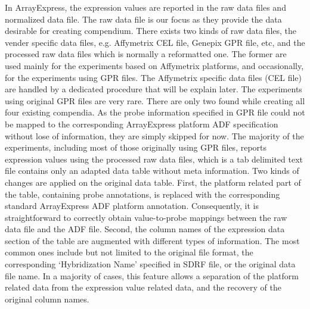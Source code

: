 In ArrayExpress, the expression values are reported in the raw data files
and normalized data file.
%
The raw data file is our focus as they provide the data desirable for
creating compendium.
%
There exists two kinds of raw data files, the vender specific data files,
e.g. Affymetrix CEL file, Genepix GPR file, etc, and the processed raw
data files which is normally a reformatted one.
%
%
The former are used mainly for the experiments based on Affymetrix platforms,
and occasionally, for the experiments using GPR files.
%
The Affymetrix specific data files (CEL file) are handled by a dedicated
procedure that will be explain later.
%
The experiments using original GPR files are very rare.  There are only
two found while creating all four existing compendia.  As the probe
information specified in GPR file could not be mapped to the
corresponding ArrayExpress platform ADF specification without lose of
information, they are simply skipped for now.
%
%
%
The majority of the experiments, including most of those originally using
GPR files, reports expression values using the processed raw data files,
which is a tab delimited text file contains only an adapted data table
without meta information.
%
Two kinds of changes are applied on the original data table.  First, the
platform related part of the table, containing probe annotations, is replaced
with the corresponding standard ArrayExpress ADF platform annotation.
%
Consequently, it is straightforward to correctly obtain value-to-probe
mappings between the raw data file and the ADF file.
%
Second, the column names of the expression data section of the table are
augmented with different types of information.  The most common ones include
but not limited to the original file format, the corresponding `Hybridization
Name' specified in SDRF file, or the original data file name.
%
In a majority of cases, this feature allows a separation of the platform
related data from the expression value related data, and the recovery of the
original column names.


